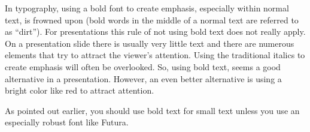 In typography, using a bold font to create emphasis, especially within
normal text, is frowned upon (bold words in the middle of a normal
text are referred to as ``dirt''). For presentations this rule of not
using bold text does not really apply. On a presentation slide there
is usually very little text and there are numerous elements that try
to attract the viewer's attention. Using the traditional italics to
create emphasis will often be overlooked. So, using bold text, seems a
good alternative in a presentation. However, an even better
alternative is using a bright color like red to attract attention.

As pointed out earlier, you should use bold text for small text
unless you use an especially robust font like Futura.



